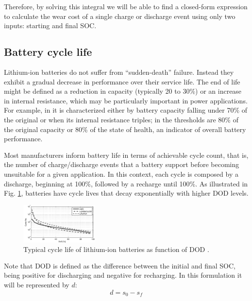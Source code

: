 \documentclass{ieeeaccess}
\begin{document}
    Therefore, by solving this integral we will be able to find a closed-form expression to calculate the wear cost of a single charge or discharge event using only two inputs: starting and final SOC.

    \subsection{Battery cycle life}
    Lithium-ion batteries do not suffer from ``sudden-death'' failure. Instead they exhibit a gradual decrease in performance over their service life. The end of life might be defined as a reduction in capacity (typically 20 to 30\%) or an increase in internal resistance, which may be particularly important in power applications. For example, in \cite{ECKER2014} it is characterized either by battery capacity falling under 70\% of the original or when its internal resistance triples; in \cite{NARAYAN2018} the thresholds are 80\% of the original capacity or 80\% of the state of health, an indicator of overall battery performance.

    Most manufacturers inform battery life in terms of achievable cycle count, that is, the number of charge/discharge events that a battery support before becoming unsuitable for a given application. In this context, each cycle is composed by a discharge, beginning at 100\%, followed by a recharge until 100\%. As illustrated in Fig. \ref{fig:acc_curves1}, batteries have cycle lives that decay exponentially with higher DOD levels.

    \begin{figure}[htbp]
        \centering
        \includegraphics[width=0.35\textwidth]{figures/acc_curves1.png}
        \caption{Typical cycle life of lithium-ion batteries as function of DOD \cite{XU2016}.}
        \label{fig:acc_curves1}
    \end{figure}

    Note that DOD is defined as the difference between the initial and final SOC, being positive for discharging and negative for recharging. In this formulation it will be represented by $d$:
    \begin{equation}
        d = s_{0}-s_{f}
        \label{eq:dod(s)}
    \end{equation}
\end{document}
